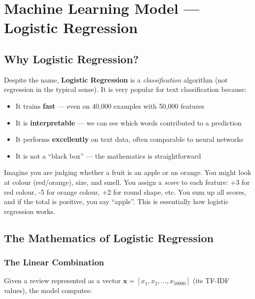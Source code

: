 \documentclass[12pt, a4paper]{article}
\begin{document}
\newpage

\section{Machine Learning Model — Logistic Regression}

\subsection{Why Logistic Regression?}

Despite the name, \textbf{Logistic Regression} is a \emph{classification} algorithm (not regression in the typical sense). It is very popular for text classification because:

\begin{itemize}
  \item It trains \textbf{fast} — even on 40{,}000 examples with 50{,}000 features
  \item It is \textbf{interpretable} — we can see which words contributed to a prediction
  \item It performs \textbf{excellently} on text data, often comparable to neural networks
  \item It is not a ``black box'' — the mathematics is straightforward
\end{itemize}

\begin{analogybox}
Imagine you are judging whether a fruit is an apple or an orange. You might look at colour (red/orange), size, and smell. You assign a \emph{score} to each feature: +3 for red colour, -5 for orange colour, +2 for round shape, etc. You sum up all scores, and if the total is positive, you say ``apple''. This is essentially how logistic regression works.
\end{analogybox}

\subsection{The Mathematics of Logistic Regression}

\subsubsection{The Linear Combination}

Given a review represented as a vector $\mathbf{x} = [x_1, x_2, \ldots, x_{50000}]$ (its TF-IDF values), the model computes:
\end{document}
